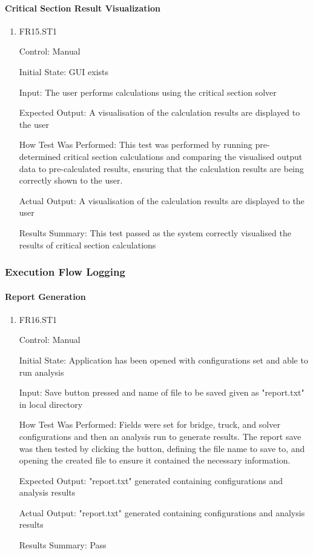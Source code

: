 \documentclass[12pt, titlepage]{article}
\begin{document}
\paragraph{Critical Section Result Visualization}

\begin{enumerate}

\item{FR15.ST1\\}

Control: Manual
				
Initial State: GUI exists
					
Input: The user performs calculations using the critical section solver
					
Expected Output: A visualisation of the calculation results are displayed to the user

How Test Was Performed: This test was performed by running pre-determined critical section calculations and comparing the visualised output data to pre-calculated results, ensuring that the calculation results are being correctly shown to the user. 
			
Actual Output: A visualisation of the calculation results are displayed to the user

Results Summary: This test passed as the system correctly visualised the results of critical section calculations
				
\end{enumerate}

\subsubsection{Execution Flow Logging}

\paragraph{Report Generation}

\begin{enumerate}

\item{FR16.ST1\\}

Control: Manual
					
Initial State: Application has been opened with configurations set and able to run analysis
					
Input: Save button pressed and name of file to be saved given as "report.txt" in local directory

How Test Was Performed: Fields were set for bridge, truck, and solver configurations and then an analysis run to generate results. The report save was then tested by clicking the button, defining the file name to save to, and opening the created file to ensure it contained the necessary information.
					
Expected Output: "report.txt" generated containing configurations and analysis results

Actual Output: "report.txt" generated containing configurations and analysis results

Results Summary: Pass
					
\end{enumerate}
\end{document}

